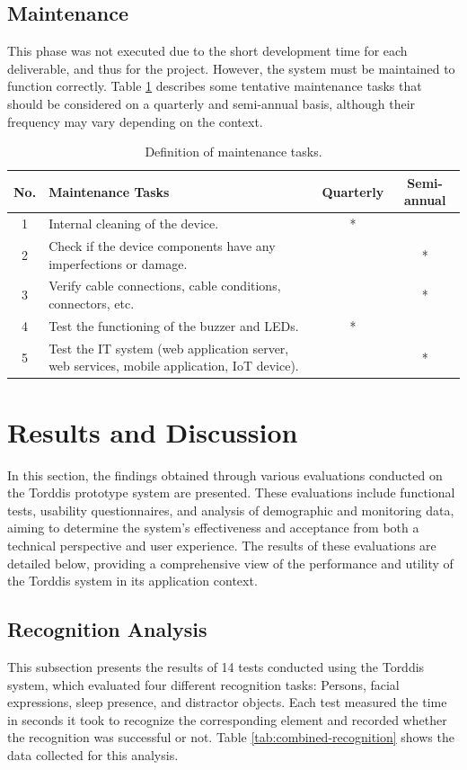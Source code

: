 \documentclass[a4paper,fleqn]{cas-sc}
\begin{document}
		\subsection{Maintenance}
			This phase was not executed due to the short development time for each deliverable, and thus for the project. However, the system must be maintained to function correctly. Table \ref{tab:maintenance-tasks} describes some tentative maintenance tasks that should be considered on a quarterly and semi-annual basis, although their frequency may vary depending on the context.
			
			\begin{table}[hbt!]
				\centering
				\caption{Definition of maintenance tasks.}
				\label{tab:maintenance-tasks}
				\begin{tabularx}{\textwidth}{cXcc}
					\toprule
					\textbf{No.} & \textbf{Maintenance Tasks} & \textbf{Quarterly} & \textbf{Semi-annual} \\
					\midrule
					1 & Internal cleaning of the device. & * & \\
					2 & Check if the device components have any imperfections or damage. & & * \\
					3 & Verify cable connections, cable conditions, connectors, etc. & & * \\
					4 & Test the functioning of the buzzer and LEDs. & * & \\
					5 & Test the IT system (web application server, web services, mobile application, IoT device). & & * \\
					\bottomrule
				\end{tabularx}
			\end{table}

	\section{Results and Discussion}
	\label{seccion:Cuatro}
		In this section, the findings obtained through various evaluations conducted on the Torddis prototype system are presented. These evaluations include functional tests, usability questionnaires, and analysis of demographic and monitoring data, aiming to determine the system's effectiveness and acceptance from both a technical perspective and user experience. The results of these evaluations are detailed below, providing a comprehensive view of the performance and utility of the Torddis system in its application context.
		
		\subsection{Recognition Analysis}
			This subsection presents the results of 14 tests conducted using the Torddis system, which evaluated four different recognition tasks: Persons, facial expressions, sleep presence, and distractor objects. Each test measured the time in seconds it took to recognize the corresponding element and recorded whether the recognition was successful or not. Table \ref{tab:combined-recognition} shows the data collected for this analysis.
			
\end{document}

